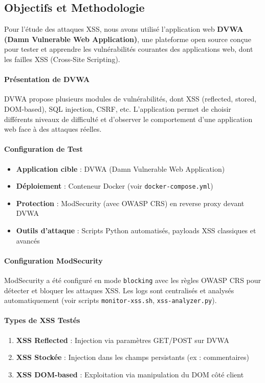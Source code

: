 \subsection{Objectifs et Methodologie}

Pour l'étude des attaques XSS, nous avons utilisé l'application web \textbf{DVWA (Damn Vulnerable Web Application)}, une plateforme open source conçue pour tester et apprendre les vulnérabilités courantes des applications web, dont les failles XSS (Cross-Site Scripting).

\paragraph{Présentation de DVWA}
DVWA propose plusieurs modules de vulnérabilités, dont XSS (reflected, stored, DOM-based), SQL injection, CSRF, etc. L'application permet de choisir différents niveaux de difficulté et d'observer le comportement d'une application web face à des attaques réelles.

\paragraph{Configuration de Test}
\begin{itemize}
    \item \textbf{Application cible} : DVWA (Damn Vulnerable Web Application)
    \item \textbf{Déploiement} : Conteneur Docker (voir \texttt{docker-compose.yml})
    \item \textbf{Protection} : ModSecurity (avec OWASP CRS) en reverse proxy devant DVWA
    \item \textbf{Outils d{'}attaque} : Scripts Python automatisés, payloads XSS classiques et avancés
\end{itemize}

\paragraph{Configuration ModSecurity}
ModSecurity a été configuré en mode \texttt{blocking} avec les règles OWASP CRS pour détecter et bloquer les attaques XSS. Les logs sont centralisés et analysés automatiquement (voir scripts \texttt{monitor-xss.sh}, \texttt{xss-analyzer.py}).

\paragraph{Types de XSS Testés}
\begin{enumerate}
    \item \textbf{XSS Reflected} : Injection via paramètres GET/POST sur DVWA
    \item \textbf{XSS Stockée} : Injection dans les champs persistants (ex : commentaires)
    \item \textbf{XSS DOM-based} : Exploitation via manipulation du DOM côté client
\end{enumerate}

